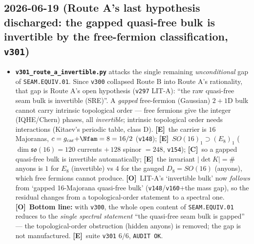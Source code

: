 \documentclass[11pt]{article}
\providecommand{\mE}{\textbf{[E]}}\providecommand{\mC}{\textbf{[C]}}
\providecommand{\mO}{\textbf{[O]}}\providecommand{\mX}{\textbf{[X]}}
\providecommand{\vref}[1]{\texttt{#1}}
\begin{document}
\subsection*{2026-06-19 (Route A's last hypothesis discharged: the gapped quasi-free bulk is invertible by the free-fermion classification, \texttt{v301})}
\begin{itemize}
\item \textbf{\texttt{v301\_route\_a\_invertible.py}} attacks the single remaining \emph{unconditional} gap of
  \texttt{SEAM.EQUIV.01}.  Since \vref{v300} collapsed Route B into Route A's rationality, that gap is Route A's
  open hypothesis (\vref{v297} LIT-A): ``the raw quasi-free seam bulk is invertible (SRE)''.  A \emph{gapped}
  free-fermion (Gaussian) $2{+}1$D bulk cannot carry intrinsic topological order --- free fermions give the
  integer (IQHE/Chern) phases, all \emph{invertible}; intrinsic topological order needs interactions (Kitaev's
  periodic table, class D).  \mE\ the carrier is $16$ Majoranas, $c=g_{\mathrm{car}}{+}\Nfam=8=16/2$
  (\vref{v148}); \mE\ $SO(16)_1\supset(E_8)_1$ ($\dim\mathfrak{so}(16)=120$ currents $+\,128$ spinor $=248$,
  \vref{v154}); \mC\ so a gapped quasi-free bulk is invertible automatically; \mE\ the invariant
  $|\det K|=\#$anyons is $1$ for $E_8$ (invertible) vs $4$ for the gauged $D_8{=}SO(16)$ (anyons), which free
  fermions cannot produce.  \mO\ LIT-A's `invertible bulk' now \emph{follows} from `gapped 16-Majorana quasi-free
  bulk' (\vref{v148}/\vref{v160}$+$the mass gap), so the residual changes from a topological-order statement to a
  spectral one.  \mO\ \textbf{Bottom line:} with \vref{v300}, the whole open content of \texttt{SEAM.EQUIV.01}
  reduces to the \emph{single spectral statement} ``the quasi-free seam bulk is gapped'' --- the topological-order
  obstruction (hidden anyons) is removed; the gap is not manufactured.  \mE\ suite \texttt{v301} $6/6$,
  \texttt{AUDIT OK}.
\end{itemize}
\end{document}
